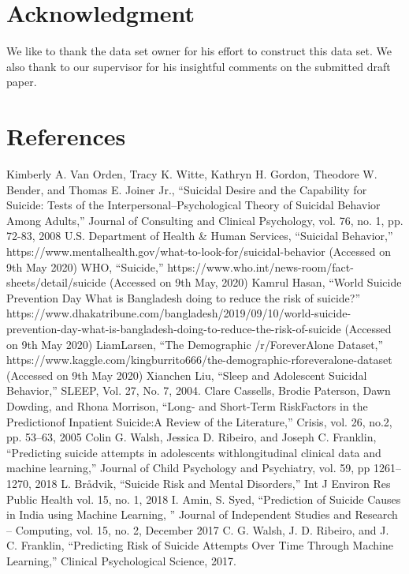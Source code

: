 \documentclass[conference]{IEEEtran}
\begin{document}
\section*{Acknowledgment}

We like to thank the data set owner for his effort to construct this data set. We also thank to our supervisor for his insightful comments on the submitted draft paper.

\section*{References}
\begin{thebibliography}{00}
Kimberly A. Van Orden, Tracy K. Witte, Kathryn H. Gordon, Theodore W. Bender, and Thomas E. Joiner Jr., “Suicidal Desire and the Capability for Suicide: Tests of the Interpersonal–Psychological Theory of Suicidal Behavior Among Adults,” Journal of Consulting and Clinical Psychology, vol. 76, no. 1, pp. 72-83, 2008
U.S. Department of Health \& Human Services, “Suicidal Behavior,” https://www.mentalhealth.gov/what-to-look-for/suicidal-behavior (Accessed on 9th May 2020)
WHO, “Suicide,” https://www.who.int/news-room/fact-sheets/detail/suicide (Accessed on 9th May, 2020)
Kamrul Hasan, “World Suicide Prevention Day \: What is Bangladesh doing to reduce the risk of suicide?” https://www.dhakatribune.com/bangladesh/2019/09/10/world-suicide-prevention-day-what-is-bangladesh-doing-to-reduce-the-risk-of-suicide  (Accessed on 9th May 2020)
LiamLarsen, “The Demographic /r/ForeverAlone Dataset,” https://www.kaggle.com/kingburrito666/the-demographic-rforeveralone-dataset (Accessed on 9th May 2020)
Xianchen Liu,  “Sleep and Adolescent Suicidal Behavior,” SLEEP, Vol. 27, No. 7, 2004.
Clare Cassells, Brodie Paterson, Dawn Dowding, and Rhona Morrison, “Long- and Short-Term RiskFactors in the Predictionof Inpatient Suicide:A Review of the Literature,” Crisis, vol. 26, no.2, pp. 53–63, 2005
Colin G. Walsh, Jessica D. Ribeiro, and Joseph C. Franklin, “Predicting suicide attempts in adolescents withlongitudinal clinical data and machine learning,” Journal of Child Psychology and Psychiatry, vol. 59, pp 1261–1270, 2018
L. Brådvik, “Suicide Risk and Mental Disorders,” Int J Environ Res Public Health vol. 15, no. 1, 2018
I. Amin, S. Syed, “Prediction of Suicide Causes in India using Machine Learning, ” Journal of Independent Studies and Research – Computing, vol. 15, no. 2, December 2017
C. G. Walsh, J. D. Ribeiro, and J. C. Franklin, “Predicting Risk of Suicide Attempts Over Time Through Machine Learning,” Clinical Psychological Science, 2017.
\end{thebibliography}
\end{document}
